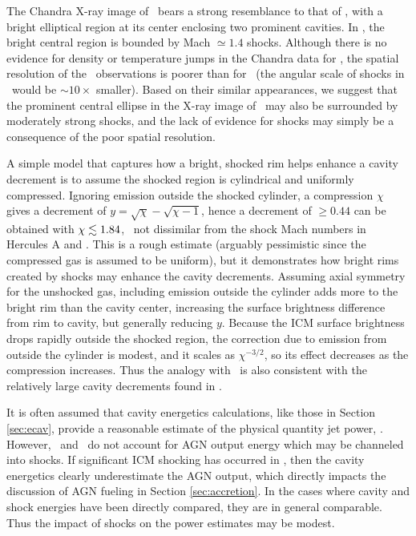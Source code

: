 \documentclass[apjpt4]{aastex}
\begin{document}
The Chandra X-ray image of \rbs\ bears a strong resemblance to that of
\ms, with a bright elliptical region at its center enclosing two
prominent cavities. In \ms, the bright central region is bounded by
Mach $\simeq 1.4$ shocks. Although there is no evidence for density or
temperature jumps in the Chandra data for \rbs, the spatial resolution
of the \rbs\ observations is poorer than for \ms\ (the angular scale
of shocks in \rbs\ would be $\sim 10\times$ smaller). Based on their
similar appearances, we suggest that the prominent central ellipse in
the X-ray image of \rbs\ may also be surrounded by moderately strong
shocks, and the lack of evidence for shocks may simply be a
consequence of the poor spatial resolution.

A simple model that captures how a bright, shocked rim helps enhance a
cavity decrement is to assume the shocked region is cylindrical and
uniformly compressed. Ignoring emission outside the shocked cylinder,
a compression $\chi$ gives a decrement of $y = \sqrt{\chi} -
\sqrt{\chi - 1}$, hence a decrement of $\ge 0.44$ can be obtained with
$\chi \lesssim 1.84$, \ie\ not dissimilar from the shock Mach numbers in
Hercules A and \ms. This is a rough estimate (arguably pessimistic
since the compressed gas is assumed to be uniform), but it
demonstrates how bright rims created by shocks may enhance the cavity
decrements. Assuming axial symmetry for the unshocked gas, including
emission outside the cylinder adds more to the bright rim than the
cavity center, increasing the surface brightness difference from rim
to cavity, but generally reducing $y$. Because the ICM surface
brightness drops rapidly outside the shocked region, the correction
due to emission from outside the cylinder is modest, and it scales as
$\chi^{-3/2}$, so its effect decreases as the compression
increases. Thus the analogy with \ms\ is also consistent with the
relatively large cavity decrements found in \rbs.

It is often assumed that cavity energetics calculations, like those in
Section \ref{sec:ecav}, provide a reasonable estimate of the physical
quantity jet power, \pjet. However, \pcav\ and \pjet\ do not account
for AGN output energy which may be channeled into shocks. If
significant ICM shocking has occurred in \rbs, then the cavity
energetics clearly underestimate the AGN output, which directly
impacts the discussion of AGN fueling in Section
\ref{sec:accretion}. In the cases where cavity and shock energies have
been directly compared, they are in general comparable. Thus the
impact of shocks on the power estimates may be modest.
\end{document}
